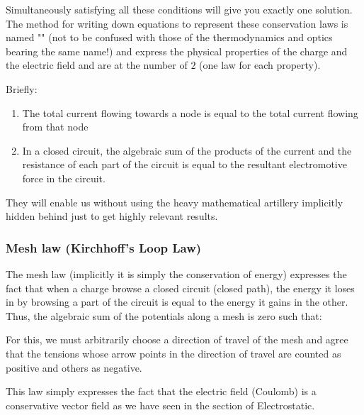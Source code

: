	Simultaneously satisfying all these conditions will give you exactly one solution. The method for writing down equations to represent these conservation laws is named "" (not to be confused with those of the thermodynamics and optics bearing the same name!) and express the physical properties of the charge and the electric field and are at the number of $2$ (one law for each property).
	
	Briefly:
	\begin{enumerate}
		\item The total current flowing towards a node is equal to the total current flowing from that node
		
		\item In a closed circuit, the algebraic sum of the products of the current and the resistance of each part of the circuit is equal to the resultant electromotive force in the circuit. 
	\end{enumerate}
	
	They will enable us without using the heavy mathematical artillery implicitly hidden behind just to get highly relevant results.
	
	\subsubsection{Mesh law (Kirchhoff's Loop Law)}
	The mesh law (implicitly it is simply the conservation of energy) expresses the fact that when a charge browse a closed circuit (closed path), the energy it loses in by browsing a part of the circuit is equal to the energy it gains in the other. Thus, the algebraic sum of the potentials along a mesh is zero such that:
	
	For this, we must arbitrarily choose a direction of travel of the mesh and agree that the tensions whose arrow points in the direction of travel are counted as positive and others as negative.
	\begin{tcolorbox}[title=Remark,colframe=black,arc=10pt]
	This law simply expresses the fact that the electric field (Coulomb) is a conservative vector field as we have seen in the section of Electrostatic.
	\end{tcolorbox}
	
